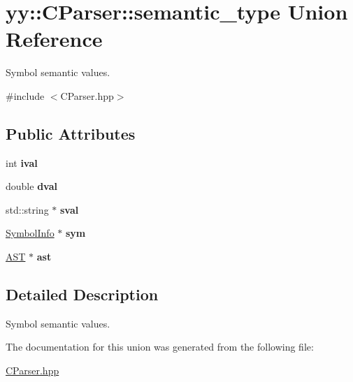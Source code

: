 \hypertarget{unionyy_1_1CParser_1_1semantic__type}{\section{yy\-:\-:C\-Parser\-:\-:semantic\-\_\-type Union Reference}
\label{unionyy_1_1CParser_1_1semantic__type}
}


Symbol semantic values.  




{\ttfamily \#include $<$C\-Parser.\-hpp$>$}

\subsection*{Public Attributes}
\begin{DoxyCompactItemize}
\item 
\hypertarget{unionyy_1_1CParser_1_1semantic__type_ae150d90656855dd1f50ce6f6ffa1511c}{int {\bfseries ival}}\label{unionyy_1_1CParser_1_1semantic__type_ae150d90656855dd1f50ce6f6ffa1511c}

\item 
\hypertarget{unionyy_1_1CParser_1_1semantic__type_a630d36deae72e4f5b1ed8e83aa9713f5}{double {\bfseries dval}}\label{unionyy_1_1CParser_1_1semantic__type_a630d36deae72e4f5b1ed8e83aa9713f5}

\item 
\hypertarget{unionyy_1_1CParser_1_1semantic__type_a64d8e6b994e85b4586fa9c87df65fa7c}{std\-::string $\ast$ {\bfseries sval}}\label{unionyy_1_1CParser_1_1semantic__type_a64d8e6b994e85b4586fa9c87df65fa7c}

\item 
\hypertarget{unionyy_1_1CParser_1_1semantic__type_ae5cb766a2aa85a5369ed9a1246205262}{\hyperlink{structSymbolInfo}{Symbol\-Info} $\ast$ {\bfseries sym}}\label{unionyy_1_1CParser_1_1semantic__type_ae5cb766a2aa85a5369ed9a1246205262}

\item 
\hypertarget{unionyy_1_1CParser_1_1semantic__type_a0b109675203def99f0913e804d769781}{\hyperlink{classAST}{A\-S\-T} $\ast$ {\bfseries ast}}\label{unionyy_1_1CParser_1_1semantic__type_a0b109675203def99f0913e804d769781}

\end{DoxyCompactItemize}


\subsection{Detailed Description}
Symbol semantic values. 

The documentation for this union was generated from the following file\-:\begin{DoxyCompactItemize}
\item 
\hyperlink{CParser_8hpp}{C\-Parser.\-hpp}\end{DoxyCompactItemize}
